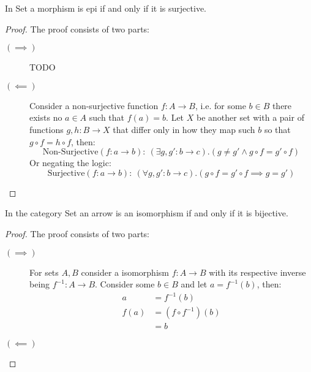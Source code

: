\begin{theorem}
  In Set a morphism is epi if and only if it is surjective.

  \begin{proof}
    The proof consists of two parts:
    \begin{description}
      \item[$(\implies)$] TODO
      \item[$(\impliedby)$] Consider a non-surjective function $f:A\to B$, i.e.
        for some $b\in B$ there exists no $a\in A$ such that $f(a) = b$. Let $X$
        be another set with a pair of functions $g, h:B\to X$ that differ only
        in how they map such $b$ so that $g\circ f = h\circ f$, then:
        \[\text{Non-Surjective}(f:a\to b):\ (\exists g, g':b\to c).(g \neq
        g' \land g\circ f = g'\circ f)\]
        Or negating the logic:
        \[\text{Surjective}(f:a\to b):\ (\forall g, g':b\to c).(g\circ f =
          g'\circ f \implies g=g')\]
    \end{description}
  \end{proof}
\end{theorem}

\begin{theorem}
  In the category Set an arrow is an isomorphism if and only if it is
  bijective.

  \begin{proof}
    The proof consists of two parts:
    \begin{description}
      \item[$(\implies)$] For sets $A,B$ consider a isomorphism $f:A\to B$ with
        its respective inverse being $f^{-1}: A\to B$. Consider some $b\in B$
        and let $a = f^{-1}(b)$, then:
        \[
          \begin{aligned}
            a &= f^{-1}(b)\\
            f(a) &= (f\circ f^{-1})(b)\\
            &= b
          \end{aligned}
        \]
      \item[$(\impliedby)$]
    \end{description}
  \end{proof}
\end{theorem}